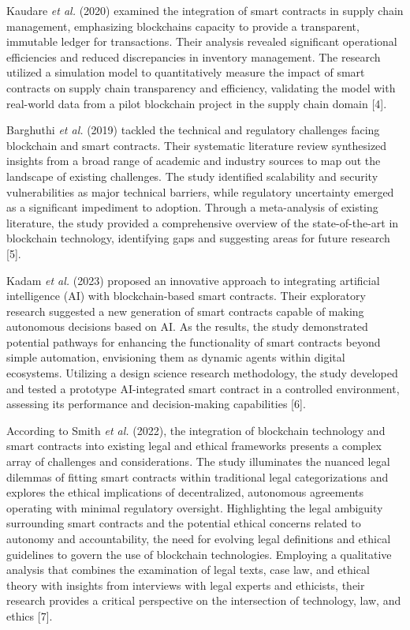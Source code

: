 Kaudare \emph{et al.} (2020) examined the integration of smart contracts
in supply chain management, emphasizing blockchain\textquotesingle s
capacity to provide a transparent, immutable ledger for transactions.
Their analysis revealed significant operational efficiencies and reduced
discrepancies in inventory management. The research utilized a
simulation model to quantitatively measure the impact of smart contracts
on supply chain transparency and efficiency, validating the model with
real-world data from a pilot blockchain project in the supply chain
domain {[}4{]}.

Barghuthi \emph{et al.} (2019) tackled the technical and regulatory
challenges facing blockchain and smart contracts. Their systematic
literature review synthesized insights from a broad range of academic
and industry sources to map out the landscape of existing challenges.
The study identified scalability and security vulnerabilities as major
technical barriers, while regulatory uncertainty emerged as a
significant impediment to adoption. Through a meta-analysis of existing
literature, the study provided a comprehensive overview of the
state-of-the-art in blockchain technology, identifying gaps and
suggesting areas for future research {[}5{]}.

Kadam \emph{et al.} (2023) proposed an innovative approach to
integrating artificial intelligence (AI) with blockchain-based smart
contracts. Their exploratory research suggested a new generation of
smart contracts capable of making autonomous decisions based on AI. As
the results, the study demonstrated potential pathways for enhancing the
functionality of smart contracts beyond simple automation, envisioning
them as dynamic agents within digital ecosystems. Utilizing a design
science research methodology, the study developed and tested a prototype
AI-integrated smart contract in a controlled environment, assessing its
performance and decision-making capabilities {[}6{]}.

According to Smith \emph{et al.} (2022), the integration of blockchain
technology and smart contracts into existing legal and ethical
frameworks presents a complex array of challenges and considerations.
The study illuminates the nuanced legal dilemmas of fitting smart
contracts within traditional legal categorizations and explores the
ethical implications of decentralized, autonomous agreements operating
with minimal regulatory oversight. Highlighting the legal ambiguity
surrounding smart contracts and the potential ethical concerns related
to autonomy and accountability, the need for evolving legal definitions
and ethical guidelines to govern the use of blockchain technologies.
Employing a qualitative analysis that combines the examination of legal
texts, case law, and ethical theory with insights from interviews with
legal experts and ethicists, their research provides a critical
perspective on the intersection of technology, law, and ethics {[}7{]}.

